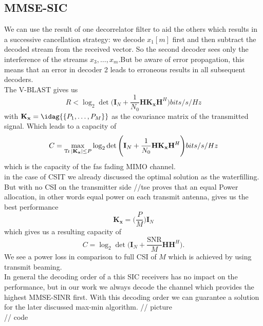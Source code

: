 \subsection{MMSE-SIC}
We can use the result of one decorrelator filter to aid the others which results in a successive cancellation strategy: we decode $x_1[m]$ first and then subtract the decoded stream from the received vector. So the second decoder sees only the interference of the streams $x_3,\dots,x_m$.But be aware of error propagation, this means that an error in decoder 2 leads to erroneous results in all subsequent decoders.\\
The V-BLAST gives us
\begin{equation}
	R<\log_2{\det{\Biggr(\mathbf{I}_N+\frac{1}{N_0}\mathbf{H}\mathbf{K_x}\mathbf{H}^H\Biggl)}} bits/s/Hz
\end{equation}
with $\mathbf{K_x} = \idag{\{P_1,\dots,P_M\}}$ as the covariance matrix of the transmitted signal. Which leads to a capacity of
\begin{equation}
	C = \max_{\operatorname*{Tr}{|\mathbf{K_x}|}\leq P}{\log_2{\det{\Biggr(\mathbf{I}_N+\frac{1}{N_0}\mathbf{H}\mathbf{K_x}\mathbf{H}^H\Biggl)}}} bits/s/Hz
\end{equation}
which is the capacity of the fas fading MIMO channel.\\
in the case of CSIT we already discussed the optimal solution as the waterfilling. But with no CSI on the transmitter side //tse proves that an equal Power allocation, in other words equal power on each transmit antenna, gives us the best performance
\begin{equation}
	\mathbf{K_x} = \Biggr(\frac{P}{M}\Biggl)\mathbf{I}_N
\end{equation}
which gives us a resulting capacity of
\begin{equation}
	C =\log_2{\det{\Biggr(\mathbf{I}_N+\frac{
	\text{SNR}}{M}\mathbf{HH}^H\Biggl)}}.
\end{equation}
We see a power loss in comparison to full CSI of $M$ which is achieved by using transmit beaming.\\
In general the decoding order of a this SIC receivers has no impact on the performance, but in our work we always decode the channel which provides the highest MMSE-SINR first. With this decoding order we can guarantee a solution for the later discussed max-min algorithm.
// picture\\
// code
